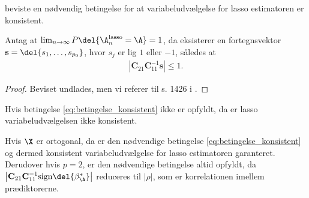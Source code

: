 \cite{adaptive_lasso} beviste en nødvendig betingelse for at variabeludvælgelse for lasso estimatoren er konsistent. 
%
\begin{thm}
Antag at \(\lim_{n \rightarrow \infty} P \del{\A_n^\text{lasso} = \A}=1\), da eksisterer en fortegnsvektor \(\mathbf{s} = \del{s_1, \ldots, s_{p_0}}\), hvor \(s_j\) er lig \(1\) eller \(-1\), således at
\begin{align}
\left\vert \mathbf{C}_{21} \mathbf{C}_{11}^{-1} \mathbf{s} \right\vert \leq 1. \label{eq:betingelse_konsistent}
\end{align}
\end{thm}
%
\begin{proof}
Beviset undlades, men vi referer til s. 1426 i \citep{adaptive_lasso}.
\end{proof}
%
Hvis betingelse \eqref{eq:betingelse_konsistent} ikke er opfyldt, da er lasso variabeludvælgelsen ikke konsistent.
%

Hvis \(\X\) er ortogonal, da er den nødvendige betingelse \eqref{eq:betingelse_konsistent} og dermed konsistent variabeludvælgelse for lasso estimatoren garanteret.
Derudover hvis \(p=2\), er den nødvendige betingelse altid opfyldt, da \(\left\vert \mathbf{C}_{21} \mathbf{C}_{11}^{-1} \text{sign} \del{\beta^*_\A} \right\vert\) reduceres til \(\vert \rho \vert\), som er korrelationen imellem prædiktorerne.




